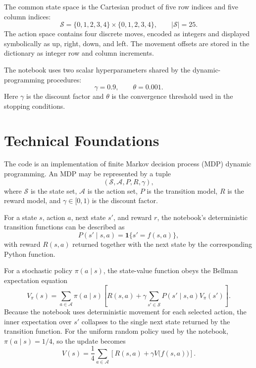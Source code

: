 \documentclass[11pt,a4paper]{article}
\newcommand{\code}[1]{\texttt{\detokenize{#1}}}
\begin{document}
The common state space is the Cartesian product of five row indices and five column indices:
\begin{equation}
\mathcal{S}=\{0,1,2,3,4\}\times\{0,1,2,3,4\},
\qquad |\mathcal{S}|=25.
\end{equation}
The action space contains four discrete moves, encoded as integers and displayed symbolically as up, right, down, and left. The movement offsets are stored in the \code{moves} dictionary as integer row and column increments.

The notebook uses two scalar hyperparameters shared by the dynamic-programming procedures:
\begin{equation}
\gamma=0.9,
\qquad
\theta=0.001.
\end{equation}
Here \(\gamma\) is the discount factor and \(\theta\) is the convergence threshold used in the stopping conditions.

\section{Technical Foundations}
The code is an implementation of finite Markov decision process (MDP) dynamic programming. An MDP may be represented by a tuple
\begin{equation}
(\mathcal{S},\mathcal{A},P,R,\gamma),
\end{equation}
where \(\mathcal{S}\) is the state set, \(\mathcal{A}\) is the action set, \(P\) is the transition model, \(R\) is the reward model, and \(\gamma\in[0,1)\) is the discount factor.

For a state \(s\), action \(a\), next state \(s'\), and reward \(r\), the notebook's deterministic transition functions can be described as
\begin{equation}
P(s'\mid s,a)=\mathbf{1}\{s'=f(s,a)\},
\end{equation}
with reward \(R(s,a)\) returned together with the next state by the corresponding Python function.

For a stochastic policy \(\pi(a\mid s)\), the state-value function obeys the Bellman expectation equation
\begin{equation}
V_\pi(s)
=
\sum_{a\in\mathcal{A}}\pi(a\mid s)
\left[
R(s,a)+\gamma\sum_{s'\in\mathcal{S}}P(s'\mid s,a)V_\pi(s')
\right].
\end{equation}
Because the notebook uses deterministic movement for each selected action, the inner expectation over \(s'\) collapses to the single next state returned by the transition function. For the uniform random policy used by the notebook, \(\pi(a\mid s)=1/4\), so the update becomes
\begin{equation}
V(s)
=\frac{1}{4}\sum_{a\in\mathcal{A}}
\left[R(s,a)+\gamma V\bigl(f(s,a)\bigr)\right].
\end{equation}
\end{document}
